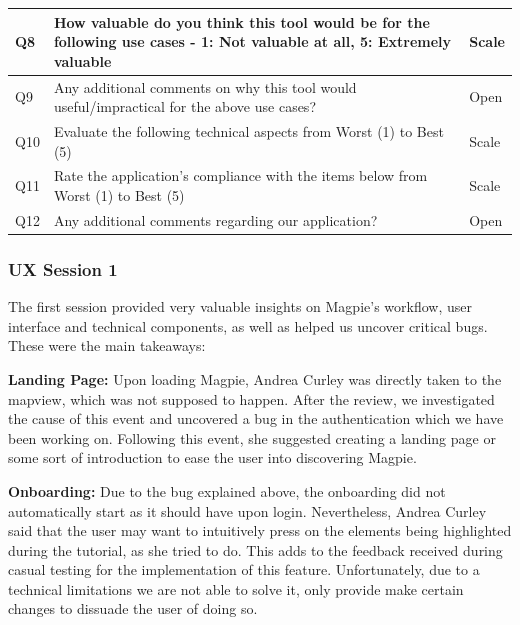 \begin{table}[h!]
\begin{tabular}{|p{}|p{}|p{}|}
        \hline
        Q8  & How valuable do you think this tool would be for the following use cases - 1: Not valuable at all, 5: Extremely valuable & Scale                  \\
        \hline
        Q9  & Any additional comments on why this tool would useful/impractical for the above use cases?                               & Open                   \\
        \hline
        Q10 & Evaluate the following technical aspects from Worst (1) to Best (5)                                                      & Scale                  \\
        \hline
        Q11 & Rate the application's compliance with the items below from Worst (1) to Best (5)                                        & Scale                  \\
        \hline
        Q12 & Any additional comments regarding our application?                                                                       & Open                   \\
        \hline
    \end{tabular}
\end{table}

\newpage{}

\subsubsection{UX Session 1}
The first session provided very valuable insights on Magpie's workflow, user
interface and technical components, as well as helped us uncover critical bugs.
These were the main takeaways:

\textbf{Landing Page: }
Upon loading Magpie, Andrea Curley was directly taken to the map\-view, which
was not supposed to happen. After the review, we investigated the cause of this
event and uncovered a bug in the authentication which we have been working on.
Following this event, she suggested creating a landing page or some sort of
introduction to ease the user into discovering Magpie.

\textbf{Onboarding: }
Due to the bug explained above, the onboarding did not automatically start as it
should have upon login. Nevertheless, Andrea Curley said that the user may want
to intuitively press on the elements being highlighted during the tutorial, as
she tried to do. This adds to the feedback received during casual testing for
the implementation of this feature. Unfortunately, due to a technical
limitations we are not able to solve it, only provide make certain changes to
dissuade the user of doing so.

